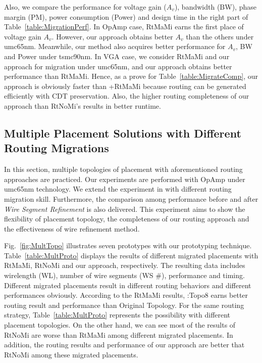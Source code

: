       Also, we compare the performance for voltage gain ($A_v$), bandwidth (BW), phase margin (PM), power consumption (Power) and design time in the right part of Table~\ref{table:MigrationPerf}. In OpAmp case, RtMaMi earns the first place of voltage gain $A_v$. However, our approach obtains better $A_v$ than the others under umc65nm. Meanwhile, our method also acquires better performance for $A_v$, BW and Power under tsmc90nm. In VGA case, we consider RtMaMi and our approach for migration under umc65nm, and our approach obtains better performance than RtMaMi. Hence, as a prove for Table~\ref{table:MigrateComp}, our approach is obviously faster than \cite{msc-bhattacharya-tcad06}+RtMaMi because routing can be generated efficiently with CDT preservation. Also, the higher routing completeness of our approach than RtNoMi's results in better runtime.


    \subsection{Multiple Placement Solutions with Different Routing Migrations}\label{sec:ExpMultiProto}

      In this section, multiple topologies of placement with aforementioned routing approaches are practiced. Our experiments are performed with OpAmp under umc65nm technology. 
      We extend the experiment in \cite{Chin_DMR_ICCAD2013} with different routing migration skill. Furthermore, the comparison among performance before and after {\it Wire Segment Refinement} is also delivered. This experiment aims to show the flexibility of placement topology, the completeness of our routing approach and the effectiveness of wire refinement method.

      Fig.~\ref{fig:MultTopo} illustrates seven prototypes with our prototyping technique. Table~\ref{table:MultProto} displays the results of different migrated placements with RtMaMi, RtNoMi and our approach, respectively. The resulting data includes wirelength (WL), number of wire segments (WS \#), performance and timing. Different migrated placements result in different routing behaviors and different performances obviously. According to the RtMaMi results, \cite{ALP_YPWeng_iccad2011}:Topo8 earns better routing result and performance than Original Topology. For the same routing strategy, Table~\ref{table:MultProto} represents the possibility with different placement topologies. On the other hand, we can see most of the results of RtNoMi are worse than RtMaMi among different migrated placements. In addition, the routing results and performance of our approach are better that RtNoMi among these migrated placements. 

